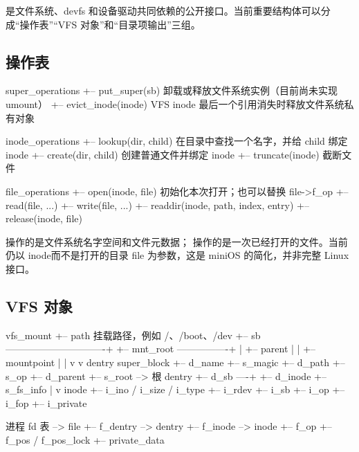  是文件系统、devfs 和设备驱动共同依赖的公开接口。当前重要结构体可以分成“操作表”“VFS 对象”和“目录项输出”三组。

\subsection{操作表}

\begin{txtcode}
super_operations
+-- put_super(sb)       卸载或释放文件系统实例（目前尚未实现 umount）
+-- evict_inode(inode)  VFS inode 最后一个引用消失时释放文件系统私有对象

inode_operations
+-- lookup(dir, child)  在目录中查找一个名字，并给 child 绑定 inode
+-- create(dir, child)  创建普通文件并绑定 inode
+-- truncate(inode)     截断文件

file_operations
+-- open(inode, file)   初始化本次打开；也可以替换 file->f_op
+-- read(file, ...)
+-- write(file, ...)
+-- readdir(inode, path, index, entry)
+-- release(inode, file)
\end{txtcode}

 操作的是文件系统名字空间和文件元数据； 操作的是一次已经打开的文件。当前  仍以 inode而不是打开的目录 file 为参数，这是 miniOS 的简化，并非完整 Linux 接口。

\subsection{VFS 对象}

\begin{txtcode}
vfs_mount
+-- path                 挂载路径，例如 /、/boot、/dev
+-- sb -------------------------------+
+-- mnt_root ----------------+        |
+-- parent                   |        |
+-- mountpoint               |        |
                             v        v
                         dentry    super_block
                         +-- d_name   +-- s_magic
                         +-- d_path   +-- s_op
                         +-- d_parent +-- s_root --> 根 dentry
                         +-- d_sb ----+
                         +-- d_inode  +-- s_fs_info
                                |
                                v
                              inode
                              +-- i_ino / i_size / i_type
                              +-- i_rdev
                              +-- i_sb
                              +-- i_op
                              +-- i_fop
                              +-- i_private

进程 fd 表 --> file
               +-- f_dentry --> dentry
               +-- f_inode  --> inode
               +-- f_op
               +-- f_pos / f_pos_lock
               +-- private_data
\end{txtcode}

